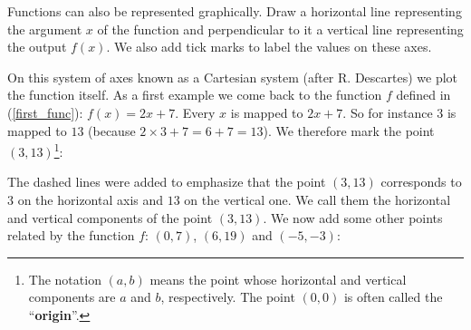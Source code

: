 \noindent Functions can also be represented graphically. Draw a horizontal line representing the argument $x$ of the function and perpendicular to it a vertical line representing the output $f(x)$. We also add tick marks to label the values on these axes.
\begin{center}
\end{center}
\noindent On this system of axes known as a Cartesian system (after R. Descartes) we plot the function itself. As a first example we come back to the function $f$ defined in (\ref{first_func}): $f(x)= 2x + 7$. Every $x$ is mapped to $2x + 7$. So for instance $3$ is mapped to $13$ (because $2\times 3 + 7 = 6+7=13$). We therefore mark the point $\left(3,13\right)$\footnote{The notation $\left( a,b \right)$ means the point whose horizontal and vertical components are $a$ and $b$, respectively. The point $\left( 0,0 \right)$ is often called the "`\textbf{origin}"'.}:
\begin{center}
\end{center}
\noindent The dashed lines were added to emphasize that the point $\left( 3,13 \right)$ corresponds to $3$ on the horizontal axis and $13$ on the vertical one. We call them the horizontal and vertical components of the point $\left( 3,13 \right)$. We now add some other points related by the function $f$: $\left( 0,7 \right)$, $\left( 6,19 \right)$ and $\left( -5,-3 \right)$:

